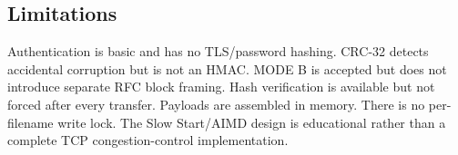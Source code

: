 \subsection{Limitations}

Authentication is basic and has no TLS/password hashing. CRC-32 detects
accidental corruption but is not an HMAC. MODE B is accepted but does not
introduce separate RFC block framing. Hash verification is available but not
forced after every transfer. Payloads are assembled in memory. There is no
per-filename write lock. The Slow Start/AIMD design is educational rather
than a complete TCP congestion-control implementation.